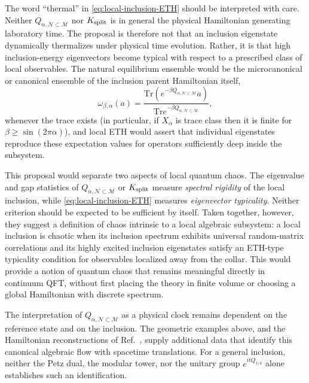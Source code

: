 \documentclass[a4paper,11pt]{article}
\theoremstyle{definition}
\newcommand{\Tr}{\text{Tr}}
\newcommand{\mN}{\mathcal{N}}
\newcommand{\mM}{\mathcal{M}}
\begin{document}
The word ``thermal'' in \eqref{eq:local-inclusion-ETH} should be interpreted with care.  Neither $Q_{\alpha,\mN\subset\mM}$ nor $K_{\rm split}$ is in general the physical Hamiltonian generating laboratory time.  The proposal is therefore not that an inclusion eigenstate dynamically thermalizes under physical time evolution.  Rather, it is that high inclusion-energy eigenvectors become typical with respect to a prescribed class of local observables.  The natural equilibrium ensemble would be the microcanonical or canonical ensemble of the inclusion parent Hamiltonian itself,
\begin{equation}
    \omega_{\beta,\alpha}(a)
    =
    \frac{
    \Tr\!\left(e^{-\beta Q_{\alpha,\mN\subset\mM}}a\right)
    }{
    \Tr e^{-\beta Q_{\alpha,\mN\subset\mM}}
    },
    \label{eq:local-inclusion-canonical}
\end{equation}
whenever the trace exists (in particular, if $X_\alpha$ is trace class then it is finite for $\beta\geq\sin(2\pi\alpha)$), and local ETH would assert that individual eigenstates reproduce these expectation values for operators sufficiently deep inside the subsystem.

This proposal would separate two aspects of local quantum chaos.  The eigenvalue and gap statistics of $Q_{\alpha,\mN\subset\mM}$ or $K_{\rm split}$ measure \emph{spectral rigidity} of the local inclusion, while \eqref{eq:local-inclusion-ETH} measures \emph{eigenvector typicality}.  Neither criterion should be expected to be sufficient by itself.  Taken together, however, they suggest a definition of chaos intrinsic to a local algebraic subsystem: a local inclusion is chaotic when its inclusion spectrum exhibits universal random-matrix correlations and its highly excited inclusion eigenstates satisfy an ETH-type typicality condition for observables localized away from the collar.  This would provide a notion of quantum chaos that remains meaningful directly in continuum QFT, without first placing the theory in finite volume or choosing a global Hamiltonian with discrete spectrum.



The interpretation of $Q_{\alpha,\mN\subset\mM}$ as a physical clock
remains dependent on the reference state and on the inclusion.  The
geometric examples above, and the Hamiltonian reconstructions of
Ref.~\cite{chen2026local}, supply additional data that identify this
canonical algebraic flow with spacetime translations.  For a general
inclusion, neither the Petz dual, the modular tower, nor the
unitary group $e^{itQ_{1/4}}$ alone establishes such an identification.
\end{document}

